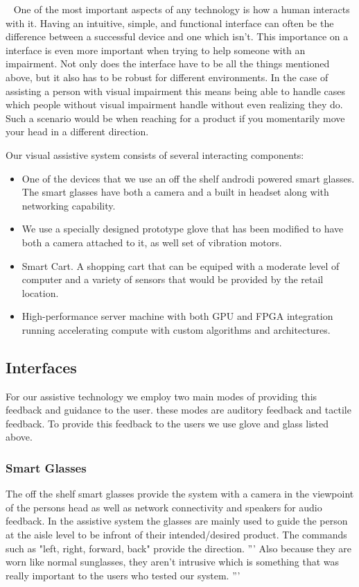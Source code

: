 ~\cite{something}
One of the most important aspects of any technology is how a human interacts with it.
Having an intuitive, simple, and functional interface can often be the difference between
a successful device and one which isn't. This importance on a interface is even more important
when trying to help someone with an impairment. Not only does the interface have to be all
the things mentioned above, but it also has to be robust for different environments. In the
case of assisting a person with visual impairment this means being able to handle cases
which people without visual impairment handle without even realizing they do. Such a scenario
would be when reaching for a product if you momentarily move your head in a different direction.

Our visual assistive system consists of several interacting components: 

\begin{itemize}
\item One of the devices that we use an off the shelf androdi powered smart glasses. 
The smart glasses have both a camera and a built in headset along with
networking capability. 

\item We use a specially designed prototype glove that has been
modified to have both a camera attached to it, as well set of
vibration motors. 

\item Smart Cart. A shopping cart that can be equiped with a moderate level of computer
and a variety of sensors that would be provided by the retail location.

\item High-performance server machine with both GPU and FPGA integration running
accelerating compute with custom algorithms and architectures.

\end{itemize}

\subsection{Interfaces}
For our assistive technology we employ two main modes of providing this feedback and guidance to the user. these modes are auditory feedback and tactile feedback. To provide this feedback to the users we use glove and glass listed above.

\subsubsection{Smart Glasses}
The off the shelf smart glasses provide the system with a camera in the viewpoint
of the persons head as well as network connectivity and speakers for audio feedback.
In the assistive system the glasses are mainly used to guide the person at the aisle level
to be infront of their intended/desired product. The commands such as "left, right, forward, back"
provide the direction.
'''
Also because they are worn like normal
sunglasses, they aren't intrusive which is something that was really
important to the users who tested our system.
'''

